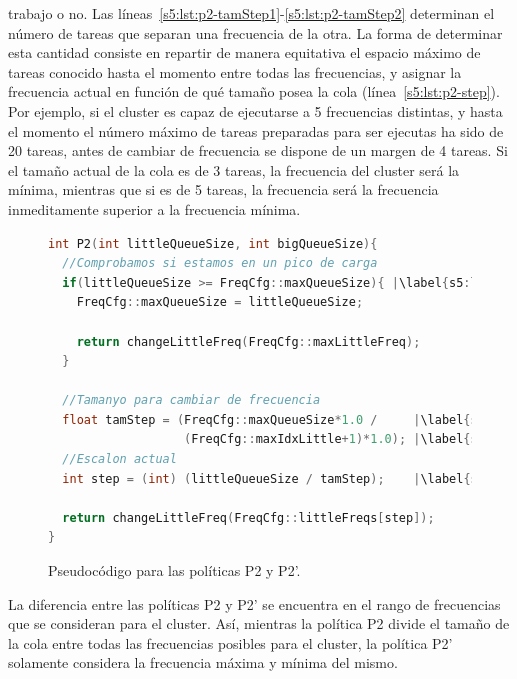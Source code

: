 trabajo o no. Las líneas~\ref{s5:lst:p2-tamStep1}-\ref{s5:lst:p2-tamStep2}
determinan el número de tareas que separan una frecuencia de la otra. La
forma de determinar esta cantidad consiste en repartir de manera equitativa
el espacio máximo de tareas conocido hasta el momento entre todas las
frecuencias, y asignar la frecuencia actual en función de qué tamaño posea
la cola (línea~\ref{s5:lst:p2-step}). Por ejemplo, si el cluster es capaz
de ejecutarse a 5 frecuencias distintas, y hasta el momento el número
máximo de tareas preparadas para ser ejecutas ha sido de 20 tareas, antes
de cambiar de frecuencia se dispone de un margen de 4 tareas. Si el tamaño
actual de la cola es de 3 tareas, la frecuencia del cluster será la mínima,
mientras que si es de 5 tareas, la frecuencia será la frecuencia
inmeditamente superior a la frecuencia mínima.

\begin{figure}
  \centering

  \begin{lstlisting}[language=C++]
int P2(int littleQueueSize, int bigQueueSize){      
  //Comprobamos si estamos en un pico de carga
  if(littleQueueSize >= FreqCfg::maxQueueSize){ |\label{s5:lst:p2-detectPico}|
    FreqCfg::maxQueueSize = littleQueueSize;

    return changeLittleFreq(FreqCfg::maxLittleFreq);
  }

  //Tamanyo para cambiar de frecuencia
  float tamStep = (FreqCfg::maxQueueSize*1.0 /     |\label{s5:lst:p2-tamStep1}|
                   (FreqCfg::maxIdxLittle+1)*1.0); |\label{s5:lst:p2-tamStep2}|
  //Escalon actual
  int step = (int) (littleQueueSize / tamStep);    |\label{s5:lst:p2-step}|

  return changeLittleFreq(FreqCfg::littleFreqs[step]);
}
  \end{lstlisting}

  \caption{Pseudocódigo para las políticas P2 y P2'.}

  \label{s5:fig:listing-p2}
\end{figure}

La diferencia entre las políticas P2 y P2' se encuentra en el rango de
frecuencias que se consideran para el cluster. Así, mientras la política P2
divide el tamaño de la cola entre todas las frecuencias posibles para el
cluster, la política P2' solamente considera la frecuencia máxima y mínima
del mismo.


